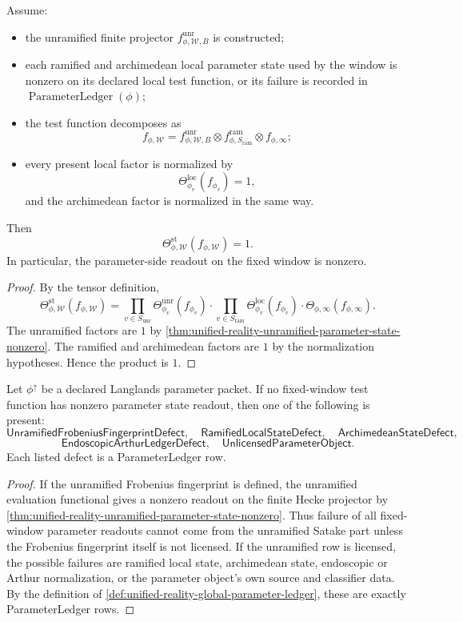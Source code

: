 \begin{theorem}
\label{thm:unified-reality-parameter-state-cert}
Assume:
\begin{itemize}
\item the unramified finite projector
$f_{\phi,\mathcal W,B}^{\mathrm{unr}}$ is constructed;
\item each ramified and archimedean local parameter state used by the
window is nonzero on its declared local test function, or its failure is
recorded in $\operatorname{ParameterLedger}(\phi)$;
\item the test function decomposes as
$$
f_{\phi,\mathcal W}
=
f_{\phi,\mathcal W,B}^{\mathrm{unr}}
\otimes
f_{\phi,S_{\mathrm{ram}}}^{\mathrm{ram}}
\otimes
f_{\phi,\infty};
$$
\item every present local factor is normalized by
$$
\Theta_{\phi_v}^{\mathrm{loc}}(f_{\phi_v})=1,
$$
and the archimedean factor is normalized in the same way.
\end{itemize}
Then
$$
\Theta_{\phi,\mathcal W}^{\mathrm{st}}(f_{\phi,\mathcal W})=1.
$$
In particular, the parameter-side readout on the fixed window is
nonzero.
\end{theorem}
\begin{proof}
By the tensor definition,
$$
\Theta_{\phi,\mathcal W}^{\mathrm{st}}(f_{\phi,\mathcal W})
=
\prod_{v\in S_{\mathrm{unr}}}
\Theta_{\phi_v}^{\mathrm{unr}}(f_{\phi_v})
\cdot
\prod_{v\in S_{\mathrm{ram}}}
\Theta_{\phi_v}^{\mathrm{loc}}(f_{\phi_v})
\cdot
\Theta_{\phi,\infty}(f_{\phi,\infty}).
$$
The unramified factors are $1$ by
\autoref{thm:unified-reality-unramified-parameter-state-nonzero}. The
ramified and archimedean factors are $1$ by the normalization
hypotheses. Hence the product is $1$.
\end{proof}

\begin{theorem}
\label{thm:unified-reality-parameter-state-defect-localization}
Let $\phi^{\uparrow}$ be a declared Langlands parameter packet. If no
fixed-window test function has nonzero parameter state readout, then one
of the following is present:
$$
\mathsf{UnramifiedFrobeniusFingerprintDefect},\quad
\mathsf{RamifiedLocalStateDefect},\quad
\mathsf{ArchimedeanStateDefect},
$$
$$
\mathsf{EndoscopicArthurLedgerDefect},\quad
\mathsf{UnlicensedParameterObject}.
$$
Each listed defect is a ParameterLedger row.
\end{theorem}
\begin{proof}
If the unramified Frobenius fingerprint is defined, the unramified
evaluation functional gives a nonzero readout on the finite Hecke
projector by
\autoref{thm:unified-reality-unramified-parameter-state-nonzero}. Thus
failure of all fixed-window parameter readouts cannot come from the
unramified Satake part unless the Frobenius fingerprint itself is not
licensed. If the unramified row is licensed, the possible failures are
ramified local state, archimedean state, endoscopic or Arthur
normalization, or the parameter object's own source and classifier data.
By the definition of
\autoref{def:unified-reality-global-parameter-ledger}, these are exactly
ParameterLedger rows.
\end{proof}

